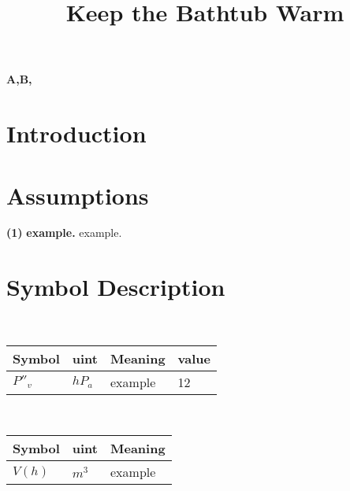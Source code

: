 \documentclass{mcmthesis}
\title{}
\date{}
\begin{document}
\begin{abstract}%


\title{Keep the Bathtub Warm}



\end{abstract}

\begin{keywords}
	\textbf{A,\indent B, \indent}
\end{keywords}
\maketitle
\tableofcontents\thispagestyle{empty}
\newpage

\setcounter{page}{1}
\section{Introduction}

\section{Assumptions}
\noindent
{\bf (1) } \textbf{example.} example.\\

\section{Symbol Description}
\begin{table}[H]
        \setlength{\abovecaptionskip}{0pt}
        \setlength{\belowcaptionskip}{0pt}
				\\
        \begin{tabular}{p{2cm}|p{2cm}|p{7.5cm}|p{1.7cm}}
		\hline
		\rowcolor[gray]{0.9}\bf{Symbol}	&\bf{uint}      &\bf{Meaning}&\bf{value}	\\
		\hline
		${P}''_{v}$		& $hP_{a}$		 & example  &12\\

		\hline
		\end{tabular}
	\end{table}

\begin{table}[H]
        \setlength{\abovecaptionskip}{0pt}
        \setlength{\belowcaptionskip}{0pt}
         \\
        \begin{tabular}{p{1.8cm}|p{2.2cm}|p{9cm}}
        \hline
        \rowcolor[gray]{0.9}\bf{Symbol}	&\bf{uint}      &\bf{Meaning}\\
        \hline
        $V(h)$			& $m^3  $		 & example \\
        \end{tabular}
        \end{table}
\end{document}
